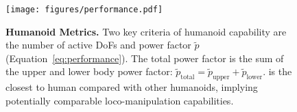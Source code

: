 \begin{figure}[t]
  \centering
  \texttt{[image: figures/performance.pdf]}
  \caption{\textbf{Humanoid Metrics.} Two key criteria of humanoid capability are the number of active DoFs and power factor $\tilde{p}$ (Equation~\ref{eq:performance}). The total power factor is the sum of the upper and lower body power factor: $\tilde{p}_{\text{total}}=\tilde{p}_{\text{upper}}+\tilde{p}_{\text{lower}}$. \system is the closest to human compared with other humanoids, implying potentially comparable loco-manipulation capabilities.}
  \label{fig:performance}
  \vspace{-5mm}
\end{figure}



